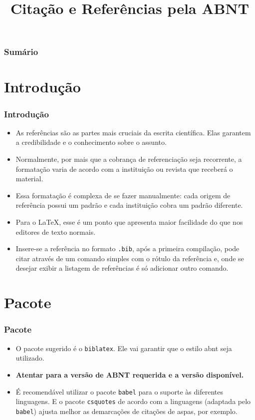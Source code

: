 \documentclass[brazilian,a4paper]{beamer}
\title{Citação e Referências pela ABNT}
\begin{document}
\frame{\titlepage}

\begin{frame}
    \frametitle{Sumário}
    \tableofcontents
\end{frame}

\section{Introdução}
\begin{frame}
    \frametitle{Introdução}

    \begin{itemize}
        \item As referências são as partes mais cruciais da escrita científica. Elas garantem a credibilidade e o conhecimento sobre o assunto. 
        \item Normalmente, por mais que a cobrança de referenciação seja recorrente, a formatação varia de acordo com a instituição ou revista que receberá o material.
        \item Essa formatação é complexa de se fazer manualmente: cada origem de referência possui um padrão e cada instituição cobra um padrão diferente.
        \item Para o \LaTeX, esse é um ponto que apresenta maior facilidade do que nos editores de texto normais.
        \item Insere-se a referência no formato \texttt{.bib}, após a primeira compilação, pode citar através de um comando simples com o rótulo da referência e, onde se desejar exibir a listagem de referências é só adicionar outro comando.
    \end{itemize}

\end{frame}

\section{Pacote}
\begin{frame}[fragile]
    \frametitle{Pacote}

    \begin{itemize}
        \item O pacote sugerido é o \texttt{biblatex}. Ele vai garantir que o estilo abnt seja utilizado. 
        \item \textbf{Atentar para a versão de ABNT requerida e a versão disponível.}
        \item É recomendável utilizar o pacote \texttt{babel} para o suporte às diferentes linguagens. E o pacote \texttt{csquotes} de acordo com a linguagens (adaptada pelo \texttt{babel}) ajusta melhor as demarcações de citações de aspas, por exemplo.
    \end{itemize}

\end{frame}
\end{document}
